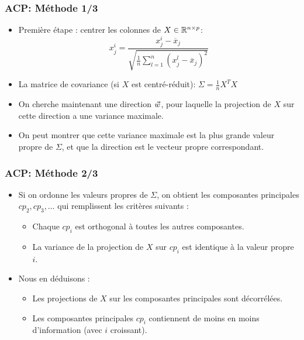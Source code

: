 \begin{frame}
\frametitle{ACP: Méthode 1/3}
  \begin{itemize}
  	\item Première étape : centrer les colonnes de $X \in {\mathbb R}^{n \times p}$: 
 \begin{equation*}
 x^i_j = \frac{x_j^i - \overline{x}_j}{\sqrt{\frac{1}{n}\sum_{l=1}^n(x_j^l - \overline{x}_j)^2}} 
 \end{equation*}
 	\item La matrice de covariance (si $X$ est centré-réduit): $\Sigma = \frac1n X^TX$ 
 	\item On cherche maintenant une direction $\vec{w}$, pour laquelle la projection de $X$ sur cette direction a une variance maximale. 
 	\item On peut montrer que cette variance maximale est la plus grande valeur propre de $\Sigma$, et que la direction est le vecteur propre correspondant. 
  \end{itemize}
\end{frame}

\begin{frame}
\frametitle{ACP: Méthode 2/3}
  \begin{itemize}
  	\item Si on ordonne les valeurs propres de $\Sigma$, on obtient les composantes principales $cp_2, cp_3, \ldots$ qui remplissent les critères suivants : 
  	\begin{itemize}
  		\item Chaque $cp_i$ est orthogonal à toutes les autres composantes.
  		\item La variance de la projection de $X$ sur $cp_i$ est identique à la valeur propre $i$. 
  	\end{itemize}
  	\item Nous en déduisons : 
  	\begin{itemize}
  		\item Les projections de $X$ sur les composantes principales sont décorrélées. 
  		\item Les composantes principales $cp_i$ contiennent de moins en moins d'information (avec $i$ croissant). 
  	\end{itemize}
  \end{itemize}
\end{frame}

